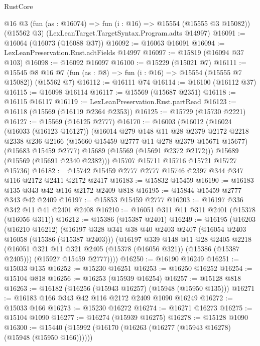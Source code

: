 \begin{lexlean}{RustCore}
\begin{coremodule}
    @16
    @3
    (fun (as : @16074) => fun (i : @16) => @15554 (@15555 @3 @15082))
    (@15562 @3)
    (LexLeanTarget.TargetSyntax.Program.adts @14997)
@16091 := @16064 (@16073 (@16088 @37))
@16092 := @16063 @16091
@16094 := LexLeanPreservation.Rust.adtFields @14997
@16097 := @15819 (@16094 @37 @103)
@16098 := @16092 @16097
@16100 := @15229 (@15021 @7)
@16111 := @15545 @8 @16 @7 (fun (as : @8) => fun (i : @16) => @15554 (@15555 @7 @15082)) (@15562 @7)
@16112 := @16111 @74
@16114 := @16100 (@16112 @37)
@16115 := @16098 @16114
@16117 := @15569 (@15687 @2351)
@16118 := @16115 @16117
@16119 := LexLeanPreservation.Rust.partRead
@16123 := @16118 (@15569 (@16119 @2364 @2353))
@16125 := @15729 (@15730 @2221)
@16127 := @15569 (@16125 @2777)
@16170 := @16003
    (@16012
      (@16024
        (@16033 (@16123 @16127))
        (@16014
          @279
          @148
          @11
          @28
          @2379
          @2172
          @2218
          @2338
          @236
          @2166
          (@15660 @15459 @2777 @11 @278 @2379 @15671 @15677)
          (@15683 @15459 @2777)
          @15689
          (@15569 (@15691 @2372 @2172)))
        @15689
        (@15569 (@15691 @2340 @2382)))
      @15707
      @15711
      @15716
      @15721
      @15727
      @15736)
@16182 := @15742 @15459 @2777 @2777 @15746 @2397 @344 @347 @116 @2172 @2411 @2172 @2417
@16183 := @15832 @15459
@16190 := @16183 @135 @343 @42 @116 @2172 @2409 @818
@16195 := @15844 @15459 @2777 @343 @42 @2409
@16197 := @15853 @15459 @2777
@16203 := @16197 @336 @342 @11 @41 @2401 @2408
@16210 := @16051 @311 @11 @311 @2401 (@15378 (@16056 @311))
@16212 := @15386 (@15387 @2401)
@16249 := @16195
    (@16203
      (@16210 @16212)
      (@16197
        @328
        @341
        @38
        @40
        @2403
        @2407
        (@16054 @2403 @16058 (@15386 (@15387 @2403)))
        (@16197
          @339
          @148
          @11
          @28
          @2405
          @2218
          (@16051 @321 @11 @321 @2405 (@15378 (@16056 @321)) (@15386 (@15387 @2405)))
          (@15927 @15459 @2777))))
@16250 := @16190 @16249
@16251 := @15033 @135
@16252 := @15230 @16251
@16253 := @16250 @16252
@16254 := @15104 @818
@16256 := @16253 (@15939 @16254)
@16257 := @15128 @818
@16263 := @16182 (@16256 (@15943 @16257) (@15948 (@15950 @135)))
@16271 := @16183 @166 @343 @42 @116 @2172 @2409 @1090 @16249
@16272 := @15033 @166
@16273 := @15230 @16272
@16274 := @16271 @16273
@16275 := @15104 @1090
@16277 := @16274 (@15939 @16275)
@16278 := @15128 @1090
@16300 := @15440
    (@15992 (@16170 (@16263 (@16277 (@15943 @16278) (@15948 (@15950 @166))))))

\end{coremodule}
\end{lexlean}
